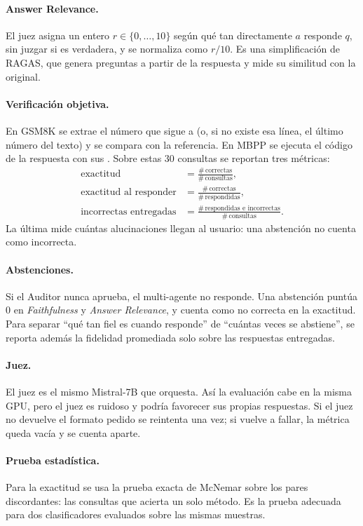 \paragraph{Answer Relevance.}
El juez asigna un entero $r \in \{0,\dots,10\}$ según qué tan directamente $a$ responde $q$, sin juzgar si es verdadera, y se normaliza como $r/10$.
Es una simplificación de RAGAS, que genera preguntas a partir de la respuesta y mide su similitud con la original.

\paragraph{Verificación objetiva.}
En GSM8K se extrae el número que sigue a  (o, si no existe esa línea, el último número del texto) y se compara con la referencia.
En MBPP se ejecuta el código de la respuesta con sus .
Sobre estas 30 consultas se reportan tres métricas:
\begin{align}
  \text{exactitud} &= \frac{\#\,\text{correctas}}{\#\,\text{consultas}}, \\
  \text{exactitud al responder} &= \frac{\#\,\text{correctas}}{\#\,\text{respondidas}}, \\
  \text{incorrectas entregadas} &= \frac{\#\,\text{respondidas e incorrectas}}{\#\,\text{consultas}}.
\end{align}
La última mide cuántas alucinaciones llegan al usuario: una abstención no cuenta como incorrecta.

\paragraph{Abstenciones.}
Si el Auditor nunca aprueba, el multi-agente no responde.
Una abstención puntúa 0 en \emph{Faithfulness} y \emph{Answer Relevance}, y cuenta como no correcta en la exactitud.
Para separar ``qué tan fiel es cuando responde'' de ``cuántas veces se abstiene'', se reporta además la fidelidad promediada solo sobre las respuestas entregadas.

\paragraph{Juez.}
El juez es el mismo Mistral-7B que orquesta.
Así la evaluación cabe en la misma GPU, pero el juez es ruidoso y podría favorecer sus propias respuestas.
Si el juez no devuelve el formato pedido se reintenta una vez; si vuelve a fallar, la métrica queda vacía y se cuenta aparte.

\paragraph{Prueba estadística.}
Para la exactitud se usa la prueba exacta de McNemar sobre los pares discordantes: las consultas que acierta un solo método.
Es la prueba adecuada para dos clasificadores evaluados sobre las mismas muestras.
